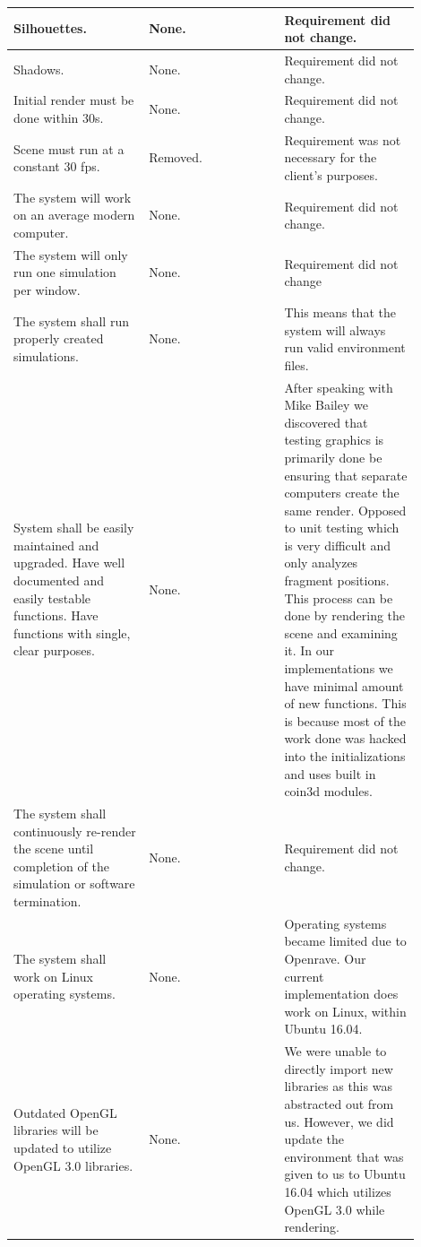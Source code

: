 \documentclass[10pt,journal,compsoc,draftclsnofoot]{IEEEtran}
\begin{document}
\begin{flushleft}
\begin{center}
\begin{table}[H]
\begin{tabular}{ | p{0.3\linewidth} | p{0.3\linewidth} | p{0.3\linewidth} | }
Silhouettes. & 
None. & 
Requirement did not change. \\ \hline

Shadows. & 
None. & 
Requirement did not change. \\ \hline

Initial render must be done within 30s. & 
None. & 
Requirement did not change. \\ \hline

Scene must run at a constant 30 fps. & 
Removed. & 
Requirement was not necessary for the client's purposes. \\ \hline

The system will work on an average modern computer. &
None. &
Requirement did not change. \\ \hline

The system will only run one simulation per window. &
None. &
Requirement did not change \\ \hline

The system shall run properly created simulations. &
None. &
This means that the system will always run valid environment files. \\ \hline

System shall be easily maintained and upgraded.
Have well documented and easily testable functions.
Have functions with single, clear purposes. &
None. &
After speaking with Mike Bailey we discovered that testing graphics is primarily done be ensuring that separate computers create the same render. 
Opposed to unit testing which is very difficult and only analyzes fragment positions.
This process can be done by rendering the scene and examining it. 
In our implementations we have minimal amount of new functions.
This is because most of the work done was hacked into the initializations and uses built in coin3d modules. \\ \hline

The system shall continuously re-render the scene until completion of the simulation or software termination. &
None. &
Requirement did not change. \\ \hline

The system shall work on Linux operating systems. &
None. &
Operating systems became limited due to Openrave.
Our current implementation does work on Linux, within Ubuntu 16.04. \\ \hline

Outdated OpenGL libraries will be updated to utilize OpenGL 3.0 libraries. &
None. &
We were unable to directly import new libraries as this was abstracted out from us.
However, we did update the environment that was given to us to Ubuntu 16.04 which utilizes OpenGL 3.0 while rendering. \\ \hline


\end{tabular}
\end{table}
\end{center}
\end{flushleft}
\end{document}
